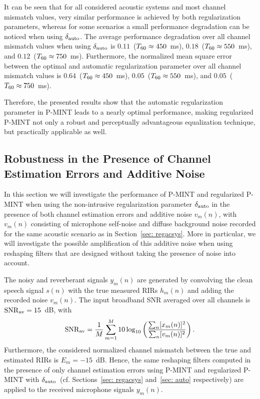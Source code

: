 \documentclass[10pt]{IEEEtran}
\begin{document}
It can be seen that for all considered acoustic systems and most channel mismatch values, very similar performance is achieved by both regularization parameters, whereas for some scenarios a small performance degradation can be noticed when using $\delta_{\rm auto}$.
The average performance degradation over all channel mismatch values when using $\delta_{\rm auto}$ is $0.11$~($T_{\rm 60} \approx 450$~ms), $0.18$~($T_{\rm 60} \approx 550$~ms), and $0.12$~($T_{\rm 60} \approx 750$~ms).
Furthermore, the normalized mean square error between the optimal and automatic regularization parameter over all channel mismatch values is $0.64$~($T_{\rm 60} \approx 450$~ms), $0.05$~($T_{\rm 60} \approx 550$~ms), and $0.05$~($T_{\rm 60} \approx 750$~ms).

Therefore, the presented results show that the automatic regularization parameter in P-MINT leads to a nearly optimal performance, making regularized P-MINT not only a robust and perceptually advantageous equalization technique, but practically applicable as well.

\subsection{Robustness in the Presence of Channel Estimation Errors and Additive Noise}
\label{sec: noise}
In this section we will investigate the performance of P-MINT and regularized P-MINT when using the non-intrusive regularization parameter $\delta_{\rm auto}$ in the presence of both channel estimation errors and additive noise $v_m(n)$, with $v_m(n)$ consisting of microphone self-noise and diffuse background noise recorded for the same acoustic scenario as in Section~\ref{sec: regacsys}.
More in particular, we will investigate the possible amplification of this additive noise when using reshaping filters that are designed without taking the presence of noise into account.

The noisy and reverberant signals $y_m(n)$ are generated by convolving the clean speech signal $s(n)$ with the true measured RIRs $h_m(n)$ and adding the recorded noise $v_m(n)$. 
The input broadband SNR averaged over all channels is ${\rm SNR}_{\rm av} = 15$~dB, with
\begin{equation}
  {\rm SNR}_{\rm av} = \frac{1}{M} \sum_{m = 1}^M 10 \log_{10} \left( \frac{\sum_{n} [x_m(n)]^2}{\sum_{n} [v_m(n)]^2}\right).
\end{equation}
Furthermore, the considered normalized channel mismatch between the true and estimated RIRs is $E_m = -15$~dB.
Hence, the same reshaping filters computed in the presence of only channel estimation errors using P-MINT and regularized P-MINT with $\delta_{\rm auto}$~(cf. Sections~\ref{sec: regacsys} and~\ref{sec: auto} respectively)  are applied to the received microphone signals $y_m(n)$.
\end{document}

